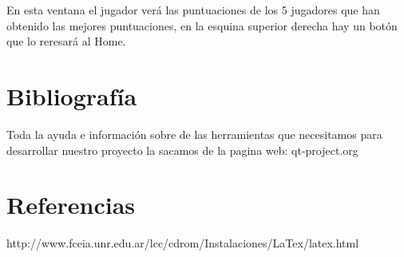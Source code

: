 \documentclass[a4paper,11pt]{article}
\begin{document}
En esta ventana el jugador verá las puntuaciones de los 5 jugadores que han obtenido las mejores puntuaciones, en la esquina superior derecha hay un botón que lo reresará al Home.



\section{Bibliografía}
Toda la ayuda e información sobre de las herramientas que necesitamos para desarrollar nuestro proyecto la sacamos de la pagina web:
qt-project.org
\section{Referencias}
http://www.fceia.unr.edu.ar/lcc/cdrom/Instalaciones/LaTex/latex.html
\end{document}
